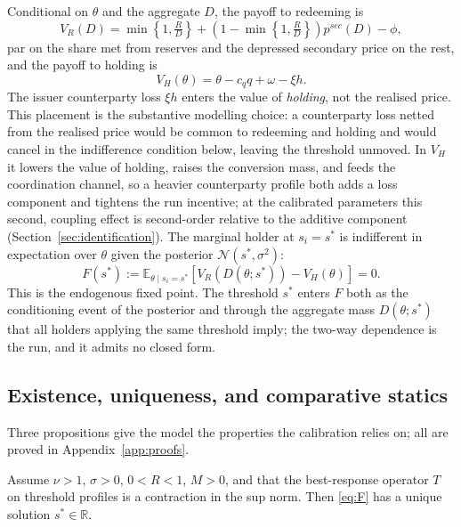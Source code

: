 Conditional on $\theta$ and the aggregate $D$, the payoff to redeeming is
\begin{equation}\label{eq:VR}
V_R(D) = \min\!\left\{1, \tfrac{R}{D}\right\} + \left(1 - \min\!\left\{1, \tfrac{R}{D}\right\}\right) p^{sec}(D) - \phi,
\end{equation}
par on the share met from reserves and the depressed secondary price on the rest, and the payoff to holding is
\begin{equation}\label{eq:VH}
V_H(\theta) = \theta - c_q q + \omega - \xi h.
\end{equation}
The issuer counterparty loss $\xi h$ enters the value of \emph{holding}, not the realised price. This placement is the substantive modelling choice: a counterparty loss netted from the realised price would be common to redeeming and holding and would cancel in the indifference condition below, leaving the threshold unmoved. In $V_H$ it lowers the value of holding, raises the conversion mass, and feeds the coordination channel, so a heavier counterparty profile both adds a loss component and tightens the run incentive; at the calibrated parameters this second, coupling effect is second-order relative to the additive component (Section~\ref{sec:identification}). The marginal holder at $s_i = s^*$ is indifferent in expectation over $\theta$ given the posterior $\mathcal{N}(s^*, \sigma^2)$:
\begin{equation}\label{eq:F}
F(s^*) := \mathbb{E}_{\theta \mid s_i = s^*}\!\left[V_R(D(\theta; s^*)) - V_H(\theta)\right] = 0.
\end{equation}
This is the endogenous fixed point. The threshold $s^*$ enters $F$ both as the conditioning event of the posterior and through the aggregate mass $D(\theta; s^*)$ that all holders applying the same threshold imply; the two-way dependence is the run, and it admits no closed form.

\subsection{Existence, uniqueness, and comparative statics}\label{sub:model_propositions}

Three propositions give the model the properties the calibration relies on; all are proved in Appendix~\ref{app:proofs}.

\begin{proposition}\label{prop:existence}
Assume $\nu > 1$, $\sigma > 0$, $0 < R < 1$, $M>0$, and that the best-response operator $T$ on threshold profiles is a contraction in the sup norm. Then \eqref{eq:F} has a unique solution $s^* \in \mathbb{R}$.
\end{proposition}

